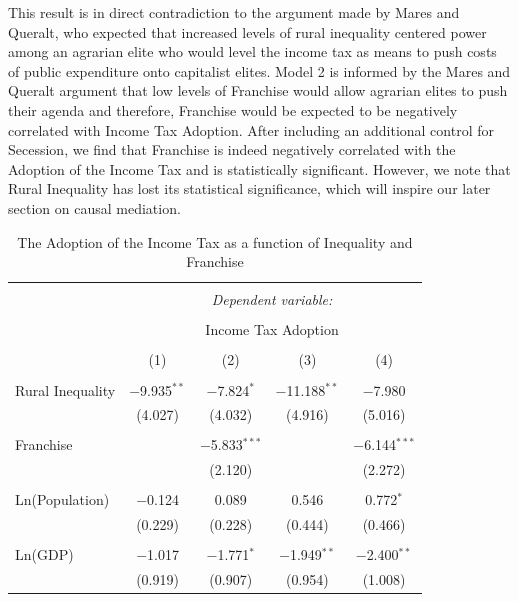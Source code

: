 \documentclass[letter, 12pt]{article}
\begin{document}
This result is in direct contradiction to the argument made by Mares and Queralt, who expected that increased levels of rural inequality centered power among an agrarian elite who would level the income tax as means to push costs of public expenditure onto capitalist elites. Model 2 is informed by the Mares and Queralt argument that low levels of Franchise would allow agrarian elites to push their agenda and therefore, Franchise would be expected to be negatively correlated with Income Tax Adoption. After including an additional control for Secession, we find that Franchise is indeed negatively correlated with the Adoption of the Income Tax and is statistically significant. However, we note that Rural Inequality has lost its statistical significance, which will inspire our later section on causal mediation.


\begin{table}[!htbp] \centering 
	\caption{The Adoption of the Income Tax as a function of Inequality and Franchise} 
	\label{} 
	\begin{tabular}{@{\extracolsep{5pt}}lcccc} 
		\\[-1.8ex]\hline 
		\hline \\[-1.8ex] 
		& \multicolumn{4}{c}{\textit{Dependent variable:}} \\ 
		\cline{2-5} 
		\\[-1.8ex] & \multicolumn{4}{c}{Income Tax Adoption} \\ 
		\\[-1.8ex] & (1) & (2) & (3) & (4)\\ 
		\hline \\[-1.8ex] 
		Rural Inequality & $-$9.935$^{**}$ & $-$7.824$^{*}$ & $-$11.188$^{**}$ & $-$7.980 \\ 
		& (4.027) & (4.032) & (4.916) & (5.016) \\ 
		& & & & \\ 
		Franchise &  & $-$5.833$^{***}$ &  & $-$6.144$^{***}$ \\ 
		&  & (2.120) &  & (2.272) \\ 
		& & & & \\ 
		Ln(Population) & $-$0.124 & 0.089 & 0.546 & 0.772$^{*}$ \\ 
		& (0.229) & (0.228) & (0.444) & (0.466) \\ 
		& & & & \\ 
		Ln(GDP) & $-$1.017 & $-$1.771$^{*}$ & $-$1.949$^{**}$ & $-$2.400$^{**}$ \\ 
		& (0.919) & (0.907) & (0.954) & (1.008) \\ 

\end{tabular}
\end{table}
\end{document}
